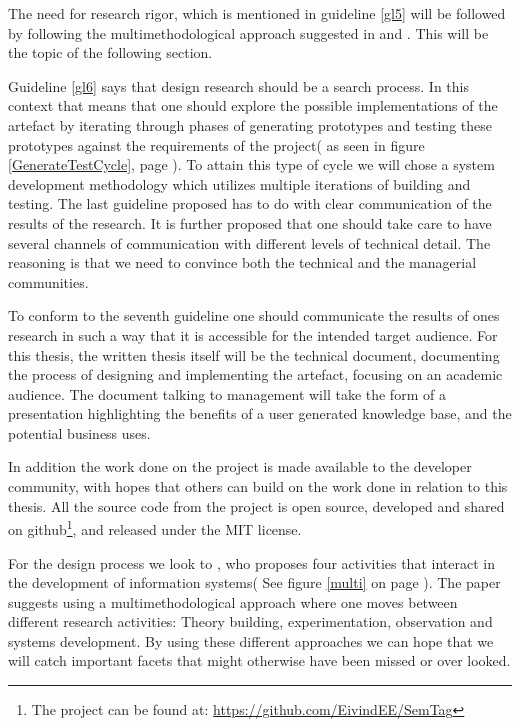 The need for research rigor, which is mentioned in guideline \ref{gl5} will be followed by following the multimethodological approach suggested in \citet{Chen1990} and \citet{NunamakerJr1990}.
This will be the topic of the following section.

Guideline \ref{gl6} says that design research should be a search process.
In this context that means that one should explore the possible implementations of the artefact by iterating through phases of generating prototypes and testing these prototypes against the requirements of the project( as seen in figure \ref{GenerateTestCycle}, page \pageref{GenerateTestCycle}).
To attain this type of cycle we will chose a system development methodology which utilizes multiple iterations of building and testing.
The last guideline proposed has to do with clear communication of the results of the research.
It is further proposed that one should take care to have several channels of communication with different levels of technical detail.
The reasoning is that we need to convince both the technical and the managerial communities.

To conform to the seventh guideline one should communicate the results of ones research in such a way that it is accessible for the intended target audience.
For this thesis, the written thesis itself will be the technical document, documenting the process of designing and implementing the artefact, focusing on an academic audience.
The document talking to management will take the form of a presentation highlighting the benefits of a user generated knowledge base, and the potential business uses.

In addition the work done on the project is made available to the developer community,
with hopes that others can build on the work done in relation to this thesis.
All the source code from the project is open source,
developed and shared on github\footnote{The project can be found at: \url{https://github.com/EivindEE/SemTag}},
and released under the MIT license.


For the design process we look to \citet{Chen1990}, who proposes four activities that interact in the development of information systems( See figure \ref{multi} on page \pageref{multi}).
The paper suggests using a multimethodological approach where one moves between different research activities: Theory building, experimentation, observation and systems development.
By using these different approaches we can hope that we will catch important facets that might otherwise have been missed or over looked.


